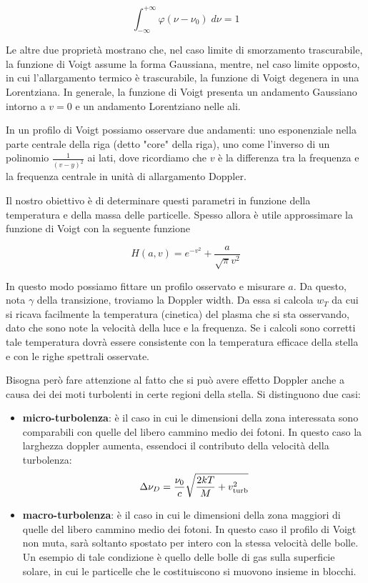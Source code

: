 \begin{equation*}
  \int_{-\infty}^{+\infty} \varphi(\nu - \nu_0) \; d\nu=1
\end{equation*}

Le altre due proprietà mostrano che, nel caso limite di smorzamento trascurabile, la funzione di Voigt assume la forma Gaussiana, mentre, nel caso limite opposto, in cui l'allargamento termico è trascurabile, la funzione di Voigt degenera in una Lorentziana. In generale, la funzione di Voigt presenta un andamento Gaussiano intorno a $v=0$ e un andamento Lorentziano nelle ali.

In un profilo di Voigt possiamo osservare due andamenti: uno esponenziale nella parte centrale della riga (detto "core" della riga), uno come l'inverso di un polinomio $\frac{1}{(v-y)^2}$ ai lati, dove ricordiamo che $v$ è la differenza tra la frequenza e la frequenza centrale in unità di allargamento Doppler.

Il nostro obiettivo è di determinare questi parametri in funzione della temperatura e della massa delle particelle. Spesso allora è utile approssimare la funzione di Voigt con la seguente funzione

\begin{equation*}
  H(a,v)=e^{-v^2}+\frac{a}{\sqrt{\pi}v^2}
\end{equation*}

In questo modo possiamo fittare un profilo osservato e misurare $a$. Da questo, nota $\gamma$ della transizione, troviamo la Doppler width. Da essa si calcola $w_T$ da cui si ricava facilmente la temperatura (cinetica) del plasma che si sta osservando, dato che sono note la velocità della luce e la frequenza. Se i calcoli sono corretti tale temperatura dovrà essere consistente con la temperatura efficace della stella e con le righe spettrali osservate.

\vspace{0.2cm}Bisogna però fare attenzione al fatto che si può avere effetto Doppler anche a causa dei dei moti turbolenti in certe regioni della stella. Si distinguono due casi:

\begin{itemize}
  \item \textbf{micro-turbolenza}: è il caso in cui le dimensioni della zona interessata sono comparabili con quelle del libero cammino medio dei fotoni. In questo caso la larghezza doppler aumenta, essendoci il contributo della velocità della turbolenza:
  \begin{equation*}
    \Delta\nu_D=\frac{\nu_0}{c} \sqrt{\frac{2kT}{M} + v^2_{\rm turb}}
  \end{equation*}
  \item \textbf{macro-turbolenza}: è il caso in cui le dimensioni della zona maggiori di quelle del libero cammino medio dei fotoni. In questo caso il profilo di Voigt non muta, sarà soltanto spostato per intero con la stessa velocità delle bolle. Un esempio di tale condizione è quello delle bolle di gas sulla superficie solare, in cui le particelle che le costituiscono si muovono insieme in blocchi.
\end{itemize}

